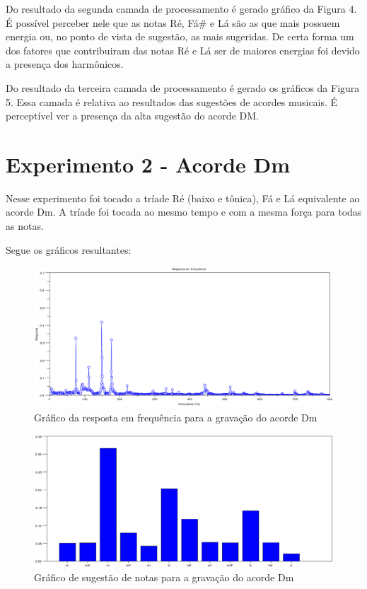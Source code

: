 Do resultado da segunda camada de processamento é gerado gráfico da Figura 4. É possível perceber nele que as notas Ré, Fá\# e Lá são as que mais possuem energia ou, no ponto de vista de sugestão, as mais sugeridas. De certa forma um dos fatores que contribuiram das notas Ré e Lá ser de maiores energias foi devido a presença dos harmônicos.

Do resultado da terceira camada de processamento é gerado os gráficos da Figura 5. Essa camada é relativa ao resultados das sugestões de acordes musicais. É perceptível ver a presença da alta sugestão do acorde DM.
\newpage
\newpage
\newpage
\section{Experimento 2 - Acorde Dm}
\label{sec:experimento2}

Nesse experimento foi tocado a tríade Ré (baixo e tônica), Fá e Lá equivalente ao acorde Dm. A tríade foi tocada ao mesmo tempo e com a mesma força para todas as notas.

Segue os gráficos resultantes:

\begin{figure}[h]
	\centering
		\includegraphics[keepaspectratio=true,scale=0.49]{figuras/Dm/fft_Dm.eps}
	\caption{Gráfico da resposta em frequência para a gravação do acorde Dm}
\end{figure}

\begin{figure}[h]
	\centering
		\includegraphics[keepaspectratio=true,scale=0.49]{figuras/Dm/notas_Dm.eps}
	\caption{Gráfico de sugestão de notas para a gravação do acorde Dm}
\end{figure}

